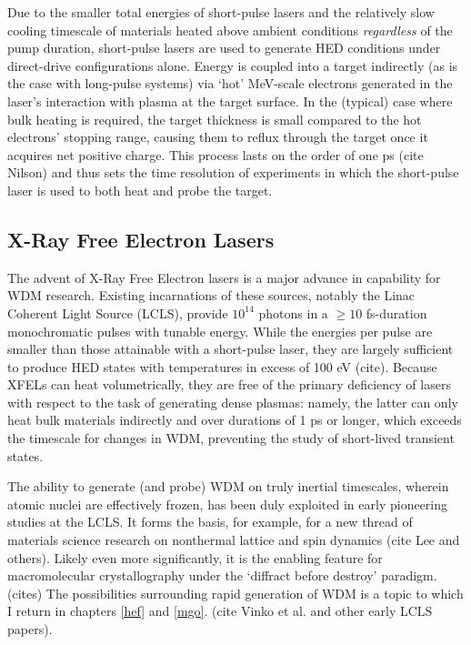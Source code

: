 \documentclass [11pt, proquest, article] {uwthesis}[2016/11/22]
\begin{document}
Due to the smaller total energies of short-pulse lasers and the relatively slow cooling timescale of materials heated above ambient conditions \textit{regardless} of the pump duration, short-pulse lasers are used to generate HED conditions under direct-drive configurations alone. Energy is coupled into a target indirectly (as is the case with long-pulse systems) via `hot' MeV-scale electrons generated in the laser's interaction with plasma at the target surface. In the (typical) case where bulk heating is required, the target thickness is small compared to the hot electrons' stopping range, causing them to reflux through the target once it acquires net positive charge. This process lasts on the order of one ps (cite Nilson) and thus sets the time resolution of experiments in which the short-pulse laser is used to both heat and probe the target.

\label{foobar}
\subsection{X-Ray Free Electron Lasers}
The advent of X-Ray Free Electron lasers is a major advance in capability for WDM research. Existing incarnations of these sources, notably the Linac Coherent Light Source (LCLS), provide $10^{14}$ photons in a $\geq 10$ fs-duration monochromatic pulses with tunable energy. While the energies per pulse are smaller than those attainable with a short-pulse laser, they are largely sufficient to produce HED states with temperatures in excess of 100 eV (cite). Because XFELs can heat volumetrically, they are free of the primary deficiency of lasers with respect to the task of generating dense plasmas: namely, the latter can only heat bulk materials indirectly and over durations of 1 ps or longer, which exceeds the timescale for changes in WDM, preventing the study of short-lived transient states.

The ability to generate (and probe) WDM on truly inertial timescales, wherein atomic nuclei are effectively frozen, has been duly exploited in early pioneering studies at the LCLS. It forms the basis, for example, for a new thread of materials science research on nonthermal lattice and spin dynamics (cite Lee and others). Likely even more significantly, it is the enabling feature for macromolecular crystallography under the `diffract before destroy' paradigm. (cites) The possibilities surrounding rapid generation of WDM is a topic to which I return in chapters \ref{hef} and \ref{mgo}. (cite Vinko et al. and other early LCLS papers).
\end{document}
